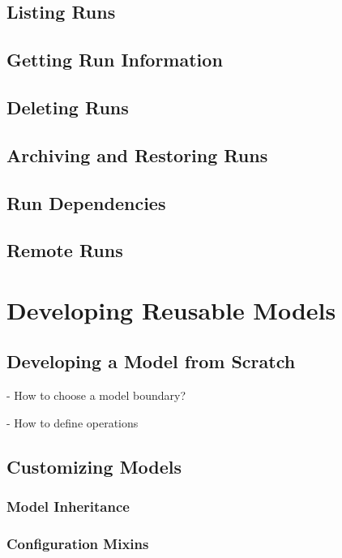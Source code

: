 \documentclass{article}
\begin{document}
\subsection{Listing Runs}

\subsection{Getting Run Information}

\subsection{Deleting Runs}

\subsection{Archiving and Restoring Runs}

\subsection{Run Dependencies}

\subsection{Remote Runs}

\section{Developing Reusable Models}

\subsection{Developing a Model from Scratch}

- How to choose a model boundary?

- How to define operations

\subsection{Customizing Models}

\subsubsection{Model Inheritance}

\subsubsection{Configuration Mixins}
\end{document}

